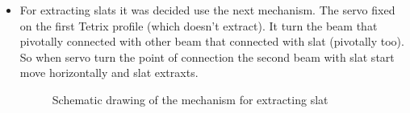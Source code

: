 \begin{itemize}
\begin{figure}[H]
\end{figure} 
\item For extracting slats it was decided use the next mechanism. The servo fixed on the first Tetrix profile (which doesn't extract). It turn the beam that pivotally connected with other beam that connected with slat (pivotally too). So when servo turn the point of connection the second beam with slat start move horizontally and slat extraxts. 
\begin{figure}[H]
	\begin{minipage}[h]{\linewidth}
		\caption{Schematic drawing of the mechanism for extracting slat}
	\end{minipage}
\end{figure}
\end{itemize}
\fillpage

